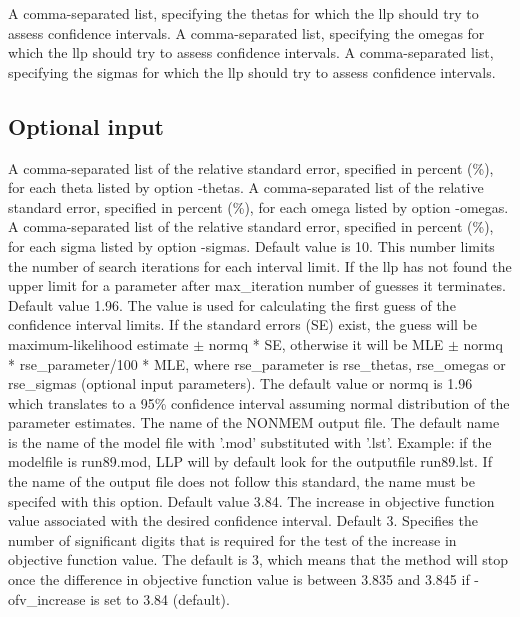 \begin{optionlist}
A comma-separated list, specifying the thetas for which the llp should try to assess confidence intervals. 
\nextopt
{}
A comma-separated list, specifying the omegas for which the llp should try to assess confidence intervals. 
\nextopt
{}
A comma-separated list, specifying the sigmas for which the llp should try to assess confidence intervals. 
\nextopt
\end{optionlist}

\subsection{Optional input}

\begin{optionlist}
A comma-separated list of the relative standard error, specified in percent (\%), for each theta listed by option -thetas. 
\nextopt
{}
A comma-separated list of the relative standard error, specified in percent (\%), for each omega listed by option -omegas. 
\nextopt
{}
A comma-separated list of the relative standard error, specified in percent (\%), for each sigma listed by option -sigmas. 
\nextopt
{}
Default value is 10. This number limits the number of search iterations for each interval limit. If the llp has not found the upper limit for a parameter after max\_iteration number of guesses it terminates. 
\nextopt
{}
Default value 1.96. The value is used for calculating the first guess of the confidence interval limits. If the standard errors (SE) exist, the guess will be maximum-likelihood estimate $\pm$ normq * SE, otherwise it will be MLE $\pm$ normq * rse\_parameter/100 * MLE, where rse\_parameter is rse\_thetas, rse\_omegas or rse\_sigmas (optional input parameters). The default value or normq is 1.96 which translates to a 95\% confidence interval assuming normal distribution of the parameter estimates. 
\nextopt
{}
The name of the NONMEM output file. The default name is the name of the model file with '.mod' substituted with '.lst'. Example: if the modelfile is run89.mod, LLP will by default look for the outputfile run89.lst. If the name of the output file does not follow this standard, the name must be specifed with this option. 
\nextopt
{}
Default value 3.84. The increase in objective function value associated with the desired confidence interval. 
\nextopt
{}
Default 3. Specifies the number of significant digits that is required for the test of the increase in objective function value. The default is 3, which means that the method will stop once the difference in objective function value is between 3.835 and 3.845 if -ofv\_increase is set to 3.84 (default). 
\nextopt
\end{optionlist}

